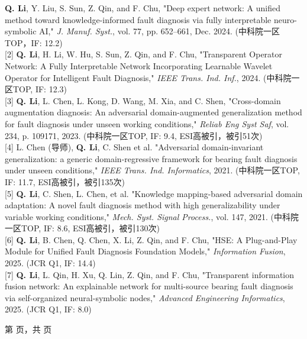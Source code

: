 \documentclass[oneside]{article}
\begin{document}
{\begin{minipage}[t][\dimexpr\textheight-2\fboxrule-2\fboxsep\relax][t]{\dimexpr0.6\textwidth-2\fboxrule-2\fboxsep\relax}
\begin{justify}
        [1] \textbf{Q. Li}, Y. Liu, S. Sun, Z. Qin, and F. Chu, "Deep expert network: A unified method toward knowledge-informed fault diagnosis via fully interpretable neuro-symbolic AI," \textit{J. Manuf. Syst.}, vol. 77, pp. 652–661, Dec. 2024. (中科院一区TOP，IF: 12.2) \\[0.5ex]

        [2] \textbf{Q. Li}, H. Li, W. Hu, S. Sun, Z. Qin, and F. Chu, "Transparent Operator Network: A Fully Interpretable Network Incorporating Learnable Wavelet Operator for Intelligent Fault Diagnosis," \textit{IEEE Trans. Ind. Inf.}, 2024. (中科院一区TOP, IF: 12.3) \\[0.5ex]

        [3] \textbf{Q. Li}, L. Chen, L. Kong, D. Wang, M. Xia, and C. Shen, "Cross-domain augmentation diagnosis: An adversarial domain-augmented generalization method for fault diagnosis under unseen working conditions," \textit{Reliab Eng Syst Saf}, vol. 234, p. 109171, 2023. (中科院一区TOP, IF: 9.4, ESI高被引，被引51次) \\[0.5ex]

        [4] L. Chen (导师), \textbf{Q. Li}, C. Shen et al. "Adversarial domain-invariant generalization: a generic domain-regressive framework for bearing fault diagnosis under unseen conditions," \textit{IEEE Trans. Ind. Informatics}, 2021. (中科院一区TOP, IF: 11.7, ESI高被引，被引135次) \\[0.5ex]

        [5] \textbf{Q. Li}, C. Shen, L. Chen, et al. "Knowledge mapping-based adversarial domain adaptation: A novel fault diagnosis method with high generalizability under variable working conditions," \textit{Mech. Syst. Signal Process.}, vol. 147, 2021. (中科院一区TOP, IF: 8.6, ESI高被引，被引130次) \\[0.5ex]

        [6] \textbf{Q. Li}, B. Chen, Q. Chen, X. Li, Z. Qin, and F. Chu, "HSE: A Plug-and-Play Module for Unified Fault Diagnosis Foundation Models," \textit{Information Fusion}, 2025. (JCR Q1, IF: 14.4) \\[0.5ex]

        [7] \textbf{Q. Li}, L. Qin, H. Xu, Q. Lin, Z. Qin, and F. Chu, "Transparent information fusion network: An explainable network for multi-source bearing fault diagnosis via self-organized neural-symbolic nodes," \textit{Advanced Engineering Informatics}, 2025. (JCR Q1, IF: 8.0)
        \end{justify}
        \vfill%
        {\hfill\small{}\selectfont 第 \thepage 页，共 \pageref{LastPage} 页\hfill}
    \end{minipage}
}
\end{document}
